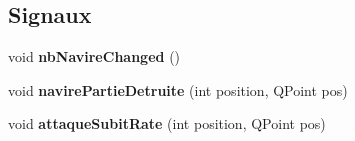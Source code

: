 \subsection*{Signaux}
\begin{DoxyCompactItemize}
\item 
void {\bfseries nb\+Navire\+Changed} ()\hypertarget{class_joueur_a18aaca01f9653ea6626e40367d75dde4}{}\label{class_joueur_a18aaca01f9653ea6626e40367d75dde4}

\item 
void {\bfseries navire\+Partie\+Detruite} (int position, Q\+Point pos)\hypertarget{class_joueur_aaf57fa0209c5e5e9ec62cf4a544cd77d}{}\label{class_joueur_aaf57fa0209c5e5e9ec62cf4a544cd77d}

\item 
void {\bfseries attaque\+Subit\+Rate} (int position, Q\+Point pos)\hypertarget{class_joueur_af7f12644d0e0aefaa136d0e2839b386f}{}\label{class_joueur_af7f12644d0e0aefaa136d0e2839b386f}

\end{DoxyCompactItemize}
